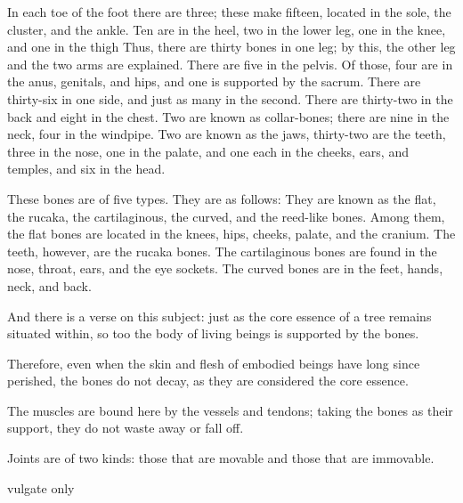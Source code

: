 \begin{translation}
\begin{tt}
\item[19]
In each toe of the foot there are three; these make fifteen, located in the sole, the cluster, and the ankle. Ten are in the heel, two in the lower leg, one in the knee, and one in the thigh Thus, there are thirty bones in one leg; by this, the other leg and the two arms are explained.  There are five in the pelvis.  Of those, four are in the anus, genitals, and hips, and one is supported by the sacrum.  There are thirty-six in one side, and just as many in the second. There are thirty-two in the back and eight in the chest. Two are known as collar-bones; there are nine in the neck, four in the windpipe.  Two are known as the jaws, thirty-two are the teeth, three in the nose, one in the palate, and one each in the cheeks, ears, and temples, and six in the head. 

\item[20]
These bones are of five types. They are as follows: They are known as the flat, the rucaka, the cartilaginous, the curved, and the reed-like bones. Among them, the flat bones are located in the knees, hips, cheeks, palate, and the cranium.  The teeth, however, are the rucaka bones. The cartilaginous bones are found in the nose, throat, ears, and the eye sockets. The curved bones are in the feet, hands, neck, and back. 

\item[21]
And there is a verse on this subject: just as the core essence of a tree remains situated within, so too the body of living beings is supported by the bones. 

\item[22]
Therefore, even when the skin and flesh of embodied beings have long since perished, the bones do not decay, as they are considered the core essence. 

\item[23]
The muscles are bound here by the vessels and tendons; taking the bones as their support, they do not waste away or fall off. 

\item[24]
Joints are of two kinds: those that are movable and those that are immovable. 
\item[25]   vulgate only


\end{tt}
\end{translation}
